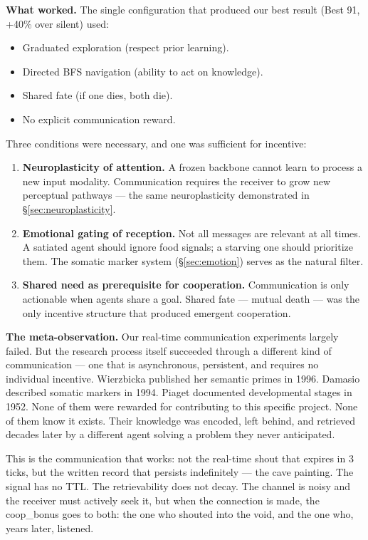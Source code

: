\documentclass{article}
\begin{document}
\textbf{What worked.} The single configuration that produced our best result (Best 91, +40\% over silent) used:
\begin{itemize}
    \item Graduated exploration (respect prior learning).
    \item Directed BFS navigation (ability to act on knowledge).
    \item Shared fate (if one dies, both die).
    \item No explicit communication reward.
\end{itemize}

Three conditions were necessary, and one was sufficient for incentive:
\begin{enumerate}
    \item \textbf{Neuroplasticity of attention.} A frozen backbone cannot learn to process a new input modality. Communication requires the receiver to grow new perceptual pathways --- the same neuroplasticity demonstrated in \S\ref{sec:neuroplasticity}.
    \item \textbf{Emotional gating of reception.} Not all messages are relevant at all times. A satiated agent should ignore food signals; a starving one should prioritize them. The somatic marker system (\S\ref{sec:emotion}) serves as the natural filter.
    \item \textbf{Shared need as prerequisite for cooperation.} Communication is only actionable when agents share a goal. Shared fate --- mutual death --- was the only incentive structure that produced emergent cooperation.
\end{enumerate}

\textbf{The meta-observation.} Our real-time communication experiments largely failed. But the research process itself succeeded through a different kind of communication --- one that is asynchronous, persistent, and requires no individual incentive. Wierzbicka published her semantic primes in 1996. Damasio described somatic markers in 1994. Piaget documented developmental stages in 1952. None of them were rewarded for contributing to this specific project. None of them know it exists. Their knowledge was encoded, left behind, and retrieved decades later by a different agent solving a problem they never anticipated.

This is the communication that works: not the real-time shout that expires in 3 ticks, but the written record that persists indefinitely --- the cave painting. The signal has no TTL. The retrievability does not decay. The channel is noisy and the receiver must actively seek it, but when the connection is made, the coop\_bonus goes to both: the one who shouted into the void, and the one who, years later, listened.
\end{document}
